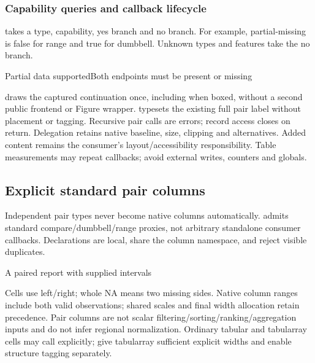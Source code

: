 \subsubsection{Capability queries and callback lifecycle}
\key{\gradbarsifpairtypecapable} takes a type, capability, yes branch and no branch.
For example, partial-missing is false for range and true for dumbbell. Unknown
types and features take the no branch.
\begin{source}
  {Partial data supported}{Both endpoints must be present or missing}
\end{source}
\key{\gradbarspairdefault} draws the captured continuation once, including when
boxed, without a second public frontend or Figure wrapper.
\key{\gradbarspairlabel} typesets the existing full pair label without placement
or tagging. Recursive pair calls are errors; record access closes on return.
Delegation retains native baseline, size, clipping and alternatives. Added
content remains the consumer's layout/accessibility responsibility. Table
measurements may repeat callbacks; avoid external writes, counters and globals.

\subsection{Explicit standard pair columns}
\label{sec:pair-columns-en}
Independent pair types never become native columns automatically.
\key{\gradbarsdeclarepaircolumn} admits standard compare/dumbbell/range proxies,
not arbitrary standalone consumer callbacks. Declarations are local, share the
column namespace, and reject visible duplicates.
\begin{demo}{A paired report with supplied intervals}
\begingroup
{}
\begin{center}
\begin{gradtable}[style=paired-report,width=\linewidth,label width=25mm]
\end{gradtable}
\end{center}
\endgroup
\end{demo}
Cells use left/right; whole NA means two missing sides. Native column ranges
include both valid observations; shared scales and final width allocation retain
precedence. Pair columns are not scalar filtering/sorting/ranking/aggregation
inputs and do not infer regional normalization.
Ordinary tabular and tabularray cells may call \key{\gradpairgraphic} explicitly;
give tabularray sufficient explicit widths and enable structure tagging separately.


